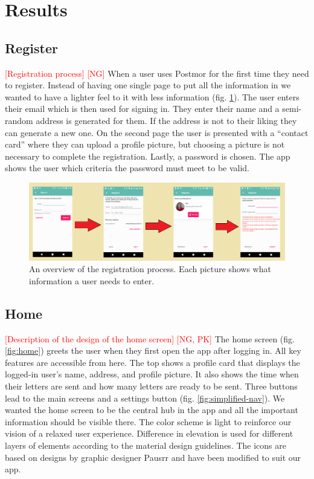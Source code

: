 \documentclass[acmlarge, review=false, screen=true]{acmart}
\begin{document}
  
  \section{Results}

    \subsection{Register}
      \textcolor{red}{[Registration process] [NG]} \newline
      When a user uses Postmor for the first time they need to register. Instead of having one single page to put all the information in we wanted to have a lighter feel to it with less information (fig. \ref{fig:register}). The user enters their email which is then used for signing in. They enter their name and a semi-random address is generated for them. If the address is not to their liking they can generate a new one. On the second page the user is presented with a “contact card” where they can upload a profile picture, but choosing a picture is not necessary to complete the registration. Lastly, a password is chosen. The app shows the user which criteria the password must meet to be valid.

      \begin{figure}
        \includegraphics[width=\textwidth]{images/LOGIN-REGISTER.png}
        \caption{An overview of the registration process. Each picture shows what information a user needs to enter.}
        \label{fig:register}
      \end{figure}

    \subsection{Home}
      \textcolor{red}{[Description of the design of the home screen] [NG, PK]} \newline
      The home screen (fig. \ref{fig:home}) greets the user when they first open the app after logging in. All key features are accessible from here. The top shows a profile card that displays the logged-in user’s name, address, and profile picture. It also shows the time when their letters are sent and how many letters are ready to be sent. Three buttons lead to the main screens and a settings button (fig. \ref{fig:simplified-nav}). We wanted the home screen to be the central hub in the app and all the important information should be visible there. The color scheme is light to reinforce our vision of a relaxed user experience. Difference in elevation is used for different layers of elements according to the material design guidelines\cite{materialdesign}. The icons are based on designs by graphic designer Pausrr\cite{pausrr} and have been modified to suit our app.
\end{document}

